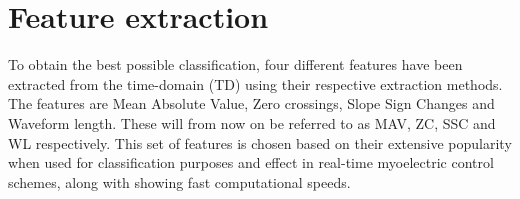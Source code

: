 

\section{Feature extraction} 

To obtain the best possible classification, four different features have been extracted from the time-domain (TD) using their respective extraction methods. The features are Mean Absolute Value, Zero crossings, Slope Sign Changes and Waveform length. These will from now on be referred to as MAV, ZC, SSC and WL respectively. This set of features is chosen based on their extensive popularity when used for classification purposes and effect in real-time myoelectric control schemes, along with showing fast computational speeds.\cite{Hudgins1993, Kamavuako2016, Scheme2010}




\cite{Hudgins1993}